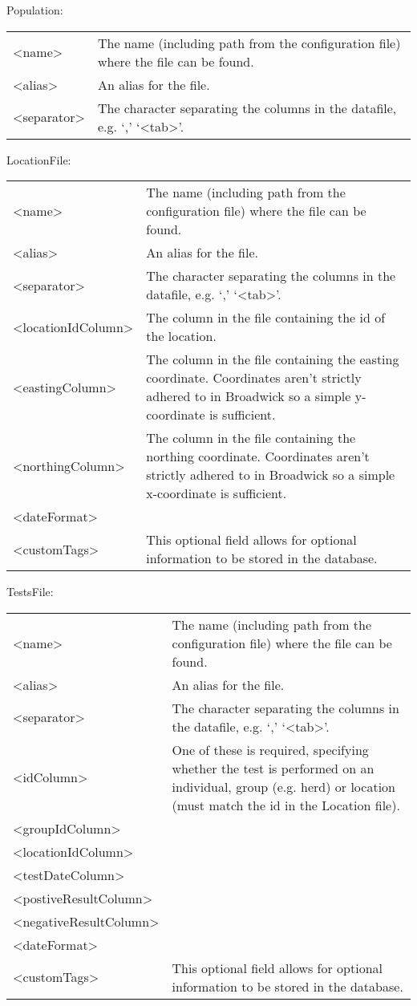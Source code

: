 Population:

\begin{tabulary}{1.0\textwidth}{l p{9cm}}
\toprule
<name> & The name (including path from the configuration file) where the file can be found.\\
<alias> & An alias for the file.\\
<separator> & The character separating the columns in the datafile, e.g. `,' `<tab>'.\\
\bottomrule
\end{tabulary}

LocationFile:

\begin{tabulary}{1.0\textwidth}{l p{9cm}}
\toprule
<name> & The name (including path from the configuration file) where the file can be found.\\
<alias> & An alias for the file.\\
<separator> & The character separating the columns in the datafile, e.g. `,' `<tab>'.\\
<locationIdColumn> & The column in the file containing the id of the location.\\
<eastingColumn> & The column in the file containing the easting coordinate. Coordinates aren’t strictly adhered to in Broadwick so a simple y-coordinate is sufficient.\\
<northingColumn> & The column in the file containing the northing coordinate. Coordinates aren’t strictly adhered to in Broadwick so a simple x-coordinate is sufficient.\\
<dateFormat> & \\
<customTags> & This optional field allows for optional information to be stored in the database.\\
\bottomrule
\end{tabulary}

TestsFile:

\begin{tabulary}{1.0\textwidth}{l p{10cm}}
\toprule
<name> & The name (including path from the configuration file) where the file can be found.\\
<alias> & An alias for the file.\\
<separator> & The character separating the columns in the datafile, e.g. `,' `<tab>'.\\
<idColumn> & One of these is required, specifying whether the test is performed on an individual, group (e.g. herd) or location (must match the id in the Location file).\\
<groupIdColumn> & \\
<locationIdColumn> & \\
<testDateColumn> & \\
<postiveResultColumn> & \\
<negativeResultColumn> & \\
<dateFormat> & \\
<customTags> & This optional field allows for optional information to be stored in the database. \\
\bottomrule
\end{tabulary}


